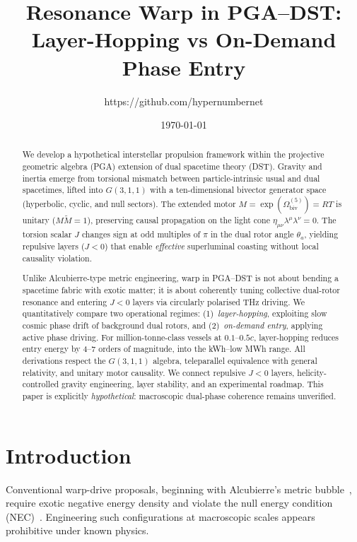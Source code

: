 \documentclass[dvipdfmx,a4paper]{article}
\title{Resonance Warp in PGA--DST:\\
Layer-Hopping vs On-Demand Phase Entry}
\author{https://github.com/hypernumbernet}
\date{\today}
\theoremstyle{definition}
\begin{document}
\maketitle

\begin{abstract}
We develop a hypothetical interstellar propulsion framework within the projective geometric algebra (PGA) extension of dual spacetime theory (DST). Gravity and inertia emerge from torsional mismatch between particle-intrinsic usual and dual spacetimes, lifted into $G(3,1,1)$ with a ten-dimensional bivector generator space (hyperbolic, cyclic, and null sectors). The extended motor $M=\exp(\Omega_{\mathrm{biv}}^{(5)})=RT$ is unitary ($M\widetilde{M}=1$), preserving causal propagation on the light cone $\eta_{\mu\nu}\lambda^\mu\lambda^\nu=0$. The torsion scalar $J$ changes sign at odd multiples of $\pi$ in the dual rotor angle $\theta_a$, yielding repulsive layers ($J<0$) that enable \emph{effective} superluminal coasting without local causality violation.

Unlike Alcubierre-type metric engineering, warp in PGA--DST is not about bending a spacetime fabric with exotic matter; it is about coherently tuning collective dual-rotor resonance and entering $J<0$ layers via circularly polarised THz driving. We quantitatively compare two operational regimes: (1)~\textit{layer-hopping}, exploiting slow cosmic phase drift of background dual rotors, and (2)~\textit{on-demand entry}, applying active phase driving. For million-tonne-class vessels at $0.1$--$0.5c$, layer-hopping reduces entry energy by 4--7 orders of magnitude, into the \si{kWh}--low \si{MWh} range. All derivations respect the $G(3,1,1)$ algebra, teleparallel equivalence with general relativity, and unitary motor causality. We connect repulsive $J<0$ layers, helicity-controlled gravity engineering, layer stability, and an experimental roadmap. This paper is explicitly \emph{hypothetical}: macroscopic dual-phase coherence remains unverified.
\end{abstract}

\section{Introduction}
\label{sec:intro}

Conventional warp-drive proposals, beginning with Alcubierre's metric bubble~\cite{alcubierre1994}, require exotic negative energy density and violate the null energy condition (NEC)~\cite{ford2000}. Engineering such configurations at macroscopic scales appears prohibitive under known physics.
\end{document}

